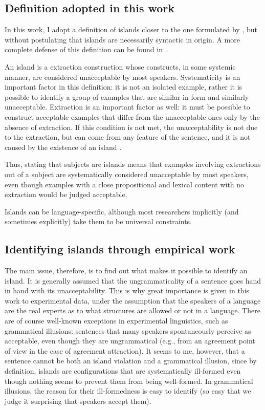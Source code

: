\subsection{Definition adopted in this work}

In this work, I adopt a definition of islands closer to the one formulated by \citeauthor{Ross.1967}, but without postulating that islands are necessarily syntactic in origin. A more complete defense of this definition can be found in \citet{Liu.Y.2022.Structural}.

An island is a extraction construction whose constructs, in some systemic manner, are considered unacceptable by most speakers. Systematicity is an important factor in this definition: it is not an isolated example, rather it is possible to identify a group of examples that are similar in form and similarly unacceptable. Extraction is an important factor as well: it must be possible to construct acceptable examples that differ from the unacceptable ones only by the absence of extraction. If this condition is not met, the unacceptability is not due to the extraction, but can come from any feature of the sentence, and it is not caused by the existence of an island \citep[77--78]{Chaves.2020.UDC}.

Thus, stating that subjects are islands means that examples involving extractions out of a subject are systematically considered unacceptable by most speakers, even though examples with a close propositional and lexical content with no extraction would be judged acceptable. 

Islands can be language-specific, although most researchers implicitly (and sometimes explicitly) take them to be universal constraints.

\subsection{Identifying islands through empirical work}

The main issue, therefore, is to find out what makes it possible to identify an island. It is generally assumed that the ungrammaticality of a sentence goes hand in hand with its unacceptability. This is why great importance is given in this work to experimental data, under the assumption that the speakers of a language are the real experts as to what structures are allowed or not in a language. There are of course well-known exceptions in experimental linguistics, such as grammatical illusions: sentences that many speakers spontaneously perceive as acceptable, even though they are ungrammatical (e.g., from an agreement point of view in the case of agreement attraction). It seems to me, however, that a sentence cannot be both an island violation and a grammatical illusion, since by definition, islands are configurations that are systematically ill-formed even though nothing seems to prevent them from being well-formed. In grammatical illusions, the reason for their ill-formedness is easy to identify (so easy that we judge it surprising that speakers accept them).


